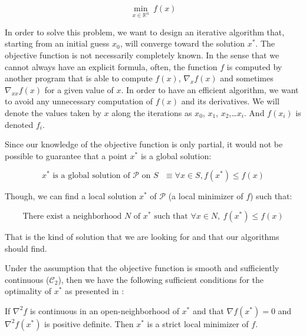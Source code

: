 \begin{equation}
  \min_{x\in\mathbb{R}^n}\ {f(x)}
\label{eq:unconstrainedOptim}
\end{equation}

In order to solve this problem, we want to design an iterative algorithm that, starting from an initial guess $x_0$, will converge toward the solution $x^*$.
The objective function is not necessarily completely known.
In the sense that we cannot always have an explicit formula, often, the function $f$ is computed by another program that is able to compute $f(x)$, $\nabla_x f(x)$ and sometimes $\nabla_{xx} f(x)$ for a given value of $x$.
In order to have an efficient algorithm, we want to avoid any unnecessary computation of $f(x)$ and its derivatives.
We will denote the values taken by $x$ along the iterations as $x_0$, $x_1$, $x_2$,\ldots $x_i$.
And $f(x_i)$ is denoted $f_i$.

Since our knowledge of the objective function is only partial, it would not be possible to guarantee that a point $x^*$ is a global solution:

\begin{equation}
  \text{$x^*$ is a global solution of $\mathcal{P}$ on $\mathit{S}$ } \equiv \forall x \in \mathit{S}, f(x^*) \leq f(x)
\end{equation}

Though, we can find a local solution $x^*$ of $\mathcal{P}$ (a local minimizer of $f$) such that:

\begin{equation}
  \text{There exist a neighborhood } \mathit{N}\text{ of }x^*\text{ such that
  }\forall x\in \mathit{N}, \ f(x^*) \leq f(x)
\end{equation}

That is the kind of solution that we are looking for and that our algorithms should find.

Under the assumption that the objective function is smooth and sufficiently continuous ($\mathcal{C}_2$), then we have the following sufficient conditions for the optimality of $x^*$ as presented in \cite{nocedal:book:2006}:

\begin{theorem}
  If $\nabla^2f$ is continuous in an open-neighborhood of $x^*$ and that $\nabla f(x^*)=0$ and $\nabla^2 f(x^*)$ is positive definite.
  Then $x^*$ is a strict local minimizer of $f$.
  \label{optimalityTheorem}
\end{theorem}


